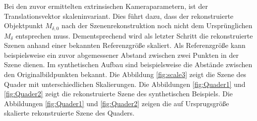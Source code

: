 Bei den zuvor ermittelten extrinsischen Kameraparametern, ist der Translationsvektor skaleninvariant. Dies führt dazu, dass der rekonstruierte Objektpunkt $M_{\delta,0}$ nach der Szenenrekonstruktion noch nicht dem Ursprünglichen $M_\delta$ entsprechen muss. Dementsprechend wird als letzter Schritt die rekonstruierte Szenen anhand einer bekannten Referenzgröße skaliert. Als Referenzgröße kann beispielsweise ein zuvor abgemessener Abstand zwischen zwei Punkten in der Szene dienen. Im synthetischen Aufbau sind beispielsweise die Abstände zwischen den Originalbildpunkten bekannt. Die Abbildung \ref{fig:scale3} zeigt die Szene des Quader mit unterschiedlichen Skalierungen. Die Abbildungen \ref{fig:Quader1} und \ref{fig:Quader2} zeigt die rekonstruierte Szene des synthetischen Beispiels. Die Abbildungen \ref{fig:Quader1} und \ref{fig:Quader2} zeigen die auf Ursprugsgröße skalierte rekonstruierte Szene des Quaders. \\


%
%


